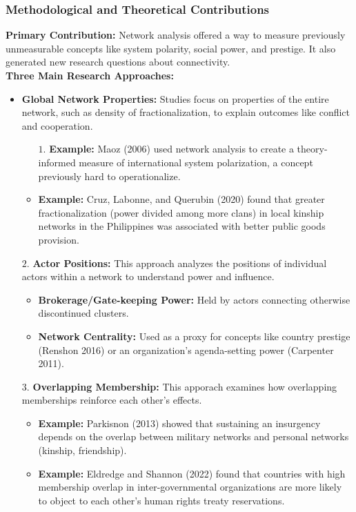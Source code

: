 \documentclass{article}
\begin{document}
    \subsubsection{Methodological and Theoretical Contributions}
    \noindent \textbf{Primary Contribution:} Network analysis offered a way
to measure previously unmeasurable concepts like system polarity, social
power, and prestige. It also generated new research questions about
connectivity.\\

    \noindent \textbf{Three Main Research Approaches:}
    \begin{itemize}
        \item \textbf{Global Network Properties:} Studies focus on
        properties of the entire network, such as density of
        fractionalization, to explain outcomes like conflict and cooperation.
        \begin{itemize}
            \item [$1$.]\textbf{Example:} Maoz (2006) used network analysis to
            create a theory-informed measure of international system
            polarization, a concept previously hard to operationalize.
            \item \textbf{Example:} Cruz, Labonne, and Querubin (2020) found
            that greater fractionalization (power divided among more clans)
            in local kinship networks in the Philippines was associated with
            better public goods provision.
        \end{itemize}
        \item [$2$.] \textbf{Actor Positions:} This approach analyzes the
        positions of individual actors within a network to understand power
        and influence.
        \begin{itemize}
            \item \textbf{Brokerage/Gate-keeping Power:} Held by actors
            connecting otherwise discontinued clusters.
            \item \textbf{Network Centrality:} Used as a proxy for concepts
            like country prestige (Renshon 2016) or an organization's
            agenda-setting power (Carpenter 2011).
        \end{itemize}
        \item[$3$.] \textbf{Overlapping Membership:} This apporach examines
        how overlapping memberships reinforce each other's effects.
        \begin{itemize}
            \item \textbf{Example:} Parkisnon (2013) showed that sustaining
            an insurgency depends on the overlap between military networks
            and personal networks (kinship, friendship).
            \item \textbf{Example:} Eldredge and Shannon (2022) found that
            countries with high membership overlap in inter-governmental
            organizations are more likely to object to each other's human
            rights treaty reservations.
        \end{itemize}
    \end{itemize}
\end{document}
